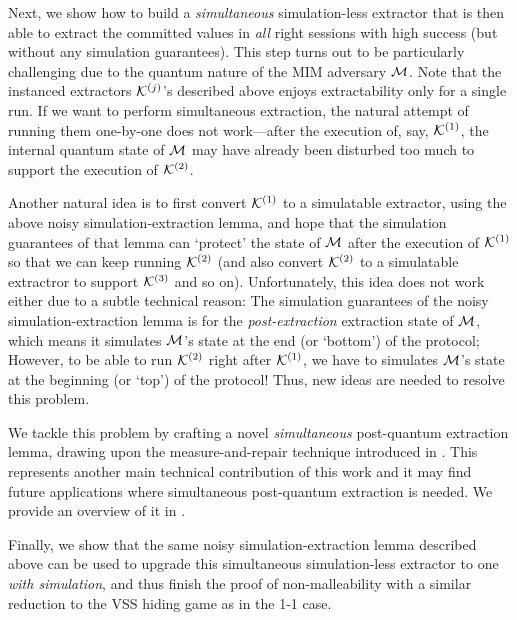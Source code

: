   Next, we show how to build a {\em simultaneous} simulation-less extractor that is then able to extract the committed values in {\em all} right sessions with high success (but without any simulation guarantees). This step turns out to be particularly challenging due to the quantum nature of the MIM adversary $\mathcal{M}$. Note that the instanced extractors $\mathcal{K}^{(j)}$'s described above enjoys extractability only for a single run. If we want to perform simultaneous extraction, the natural attempt of running them one-by-one does not work---after the execution of, say, $\mathcal{K}^{(1)}$, the internal quantum state of $\mathcal{M}$ may have already been disturbed too much to support the execution of $\mathcal{K}^{(2)}$. 

    Another natural idea is to first convert $\mathcal{K}^{(1)}$ to a simulatable extractor, using the above noisy simulation-extraction lemma, and hope that the simulation guarantees of that lemma can `protect' the state of $\mathcal{M}$ after the execution of $\mathcal{K}^{(1)}$ so that we can keep running $\mathcal{K}^{(2)}$ (and also convert $\mathcal{K}^{(2)}$ to a simulatable extractror to support $\mathcal{K}^{(3)}$ and so on). Unfortunately, this idea does not work either due to a subtle technical reason: The simulation guarantees of the noisy simulation-extraction lemma is for the {\em post-extraction} extraction state of $\mathcal{M}$, which means it simulates $\mathcal{M}$'s state at the end (or `bottom') of the protocol; However, to be able to run $\mathcal{K}^{(2)}$ right after $\mathcal{K}^{(1)}$, we have to simulates $\mathcal{M}$'s state at the beginning (or `top') of the protocol! Thus, new ideas are needed to resolve this problem.

    We tackle this problem by crafting a novel {\em simultaneous} post-quantum extraction lemma, drawing upon the measure-and-repair technique introduced in \cite{TCC:Zhandry20,FOCS:CMSZ21}. This represents another main technical contribution of this work and it may find future applications where simultaneous post-quantum extraction is needed. We provide an overview of it in . 



  Finally, we show that the same noisy simulation-extraction lemma described above can be used to upgrade this simultaneous simulation-less extractor to one {\em with simulation}, and thus finish the proof of non-malleability with a similar reduction to the VSS hiding game as in the 1-1 case.

    



